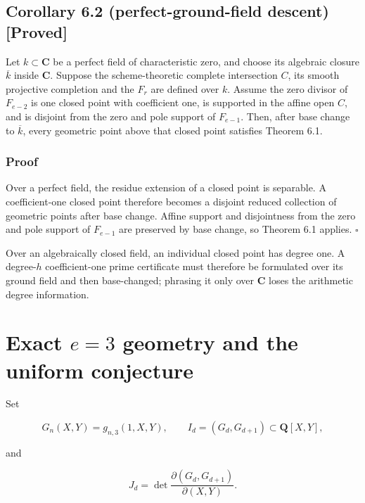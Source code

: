 \documentclass[
]{article}
\begin{document}
\subsection*{Corollary 6.2 (perfect-ground-field descent)
{[}Proved{]}}\label{corollary-6.2-perfect-ground-field-descent-proved}

Let \(k\subset\mathbf C\) be a perfect field of characteristic zero, and
choose its algebraic closure \(\overline k\) inside \(\mathbf C\).
Suppose the scheme-theoretic complete intersection \(C\), its smooth
projective completion and the \(F_r\) are defined over \(k\). Assume the
zero divisor of \(F_{e-2}\) is one closed point with coefficient one, is
supported in the affine open \(C\), and is disjoint from the zero and
pole support of \(F_{e-1}\). Then, after base change to \(\overline k\),
every geometric point above that closed point satisfies Theorem 6.1.

\subsubsection*{Proof}\label{proof-7}

Over a perfect field, the residue extension of a closed point is
separable. A coefficient-one closed point therefore becomes a disjoint
reduced collection of geometric points after base change. Affine support
and disjointness from the zero and pole support of \(F_{e-1}\) are
preserved by base change, so Theorem 6.1 applies. \(\square\)

Over an algebraically closed field, an individual closed point has
degree one. A degree-\(h\) coefficient-one prime certificate must
therefore be formulated over its ground field and then base-changed;
phrasing it only over \(\mathbf C\) loses the arithmetic degree
information.

\section{\texorpdfstring{Exact \(e=3\) geometry and the uniform
conjecture}{Exact e=3 geometry and the uniform conjecture}}\label{exact-e3-geometry-and-the-uniform-conjecture}

Set

\[
G_n(X,Y)=g_{n,3}(1,X,Y),\qquad
I_d=(G_d,G_{d+1})\subset\mathbf Q[X,Y],
\]

and

\[
J_d=\det\frac{\partial(G_d,G_{d+1})}{\partial(X,Y)}.
\]
\end{document}
